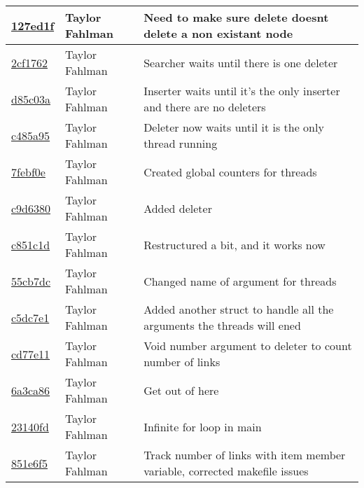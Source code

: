 \begin{tabular}{l l l}
\href{git@github.com:fahlmant/cs444/commit/127ed1fa55392ce67c5082eed8e2f7a73db2026b}{127ed1f} & Taylor Fahlman & Need to make sure delete doesnt delete a non existant node\\\hline
\href{git@github.com:fahlmant/cs444/commit/2cf17628d8ca7888520cf9403f2577f57806bd71}{2cf1762} & Taylor Fahlman & Searcher waits until there is one deleter\\\hline
\href{git@github.com:fahlmant/cs444/commit/d85c03a6b857f72891efa170e38dc11395d77ae4}{d85c03a} & Taylor Fahlman & Inserter waits until it's the only inserter and there are no deleters\\\hline
\href{git@github.com:fahlmant/cs444/commit/c485a95c353e793a843ad6bdac4eea06562e642a}{c485a95} & Taylor Fahlman & Deleter now waits until it is the only thread running\\\hline
\href{git@github.com:fahlmant/cs444/commit/7febf0eb7674a18771178778a1b1b246e9722602}{7febf0e} & Taylor Fahlman & Created global counters for threads\\\hline
\href{git@github.com:fahlmant/cs444/commit/c9d63807d789e377e196ce1a94e3320a7514a901}{c9d6380} & Taylor Fahlman & Added deleter\\\hline
\href{git@github.com:fahlmant/cs444/commit/c851c1dc8be7c97ca7bbbe94fa9d80150763d259}{c851c1d} & Taylor Fahlman & Restructured a bit, and it works now\\\hline
\href{git@github.com:fahlmant/cs444/commit/55cb7dc0b437c2cc03c1a7683558cd48dd96c634}{55cb7dc} & Taylor Fahlman & Changed name of argument for threads\\\hline
\href{git@github.com:fahlmant/cs444/commit/c5dc7e1f2b65460a3e119935f06968ed0f8b2691}{c5dc7e1} & Taylor Fahlman & Added another struct to handle all the arguments the threads will ened\\\hline
\href{git@github.com:fahlmant/cs444/commit/cd77e11202390d5f7cdad25b2e5ecfa5d42f7dcd}{cd77e11} & Taylor Fahlman & Void number argument to deleter to count number of links\\\hline
\href{git@github.com:fahlmant/cs444/commit/6a3ca86d0ff1a6e3894d9f03838f423564d0a755}{6a3ca86} & Taylor Fahlman & Get out of here\\\hline
\href{git@github.com:fahlmant/cs444/commit/23140fd4536d1b8552c0db457dcfa4e2b8161635}{23140fd} & Taylor Fahlman & Infinite for loop in main\\\hline
\href{git@github.com:fahlmant/cs444/commit/851e6f51a0b171ec4deac5923320cae97a549be6}{851e6f5} & Taylor Fahlman & Track number of links with item member variable, corrected makefile issues\\\hline

\end{tabular}
